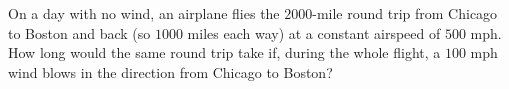 On a day with no wind, an airplane flies the $2000$-mile round trip from Chicago to Boston and back (so $1000$ miles each way) at a constant airspeed of $500$ mph. How long would the same round trip take if, during the whole flight, a $100$ mph wind blows in the direction from Chicago to Boston?
